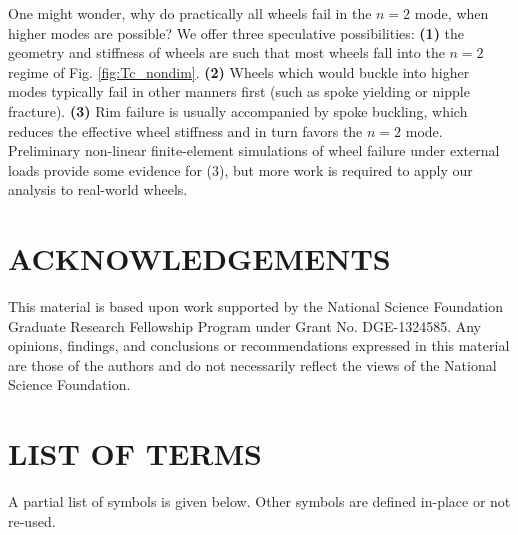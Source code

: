 \documentclass{bmd2016p}
\begin{document}
One might wonder, why do practically all wheels fail in the $n=2$ mode, when higher modes are possible? We offer three speculative possibilities: \textbf{(1)} the geometry and stiffness of wheels are such that most wheels fall into the $n=2$ regime of Fig. \ref{fig:Tc_nondim}. \textbf{(2)} Wheels which would buckle into higher modes typically fail in other manners first (such as spoke yielding or nipple fracture). \textbf{(3)} Rim failure is usually accompanied by spoke buckling, which reduces the effective wheel stiffness and in turn favors the $n=2$ mode. Preliminary non-linear finite-element simulations of wheel failure under external loads provide some evidence for (3), but more work is required to apply our analysis to real-world wheels.



\section*{ACKNOWLEDGEMENTS}
This material is based upon work supported by the National Science Foundation Graduate Research Fellowship Program under Grant No. DGE-1324585. Any opinions, findings, and conclusions or recommendations expressed in this material are those of the authors and do not necessarily reflect the views of the National Science Foundation.






\newpage
\section*{LIST OF TERMS}
A partial list of symbols is given below. Other symbols are defined in-place or not re-used.
\end{document}

